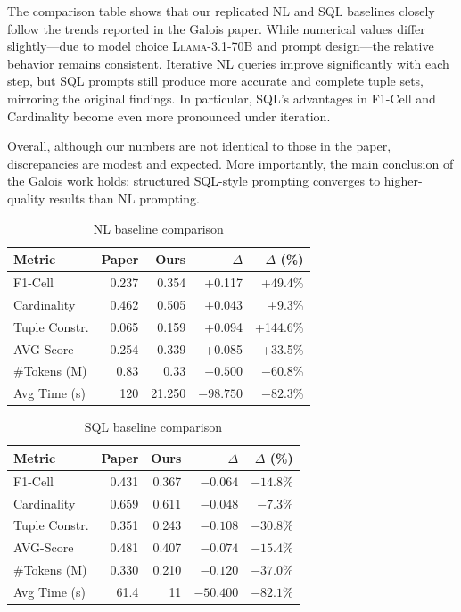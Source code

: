\documentclass[12pt]{article}
\begin{document}
The comparison table shows that our replicated NL and SQL baselines closely follow the trends reported in the Galois paper. While numerical values differ slightly---due to model choice \textsc{Llama-3.1-70B} and prompt design---the relative behavior remains consistent. Iterative NL queries improve significantly with each step, but SQL prompts still produce more accurate and complete tuple sets, mirroring the original findings. In particular, SQL’s advantages in F1-Cell and Cardinality become even more pronounced under iteration.

Overall, although our numbers are not identical to those in the paper, discrepancies are modest and expected. More importantly, the main conclusion of the Galois work holds: structured SQL-style prompting converges to higher-quality results than NL prompting.



\begin{table}[H]
  \centering
  \caption{NL baseline comparison}
  \label{tab:nl-comparison}
  \begin{tabular}{lrrrr}
    \hline
    \textbf{Metric} & \textbf{Paper} & \textbf{Ours} & $\Delta$ & $\Delta$ (\%) \\
    \hline
    F1-Cell       & 0.237   & 0.354   & +0.117   & +49.4\%  \\
    Cardinality   & 0.462   & 0.505   & +0.043   & +9.3\%   \\
    Tuple Constr. & 0.065   & 0.159   & +0.094   & +144.6\% \\
    AVG-Score     & 0.254   & 0.339   & +0.085   & +33.5\%  \\
    \#Tokens (M)  & 0.83   & 0.33   & $-0.500$ & $-60.8$\% \\
    Avg Time (s)  & 120 & 21.250  & $-98.750$& $-82.3$\% \\
    \hline
  \end{tabular}
\end{table}

\begin{table}[H]
  \centering
  \caption{SQL baseline comparison}
  \label{tab:sql-comparison}
  \begin{tabular}{lrrrr}
    \hline
    \textbf{Metric} & \textbf{Paper} & \textbf{Ours} & $\Delta$ & $\Delta$ (\%) \\
    \hline
    F1-Cell       & 0.431  & 0.367  & $-0.064$  & $-14.8$\% \\
    Cardinality   & 0.659  & 0.611  & $-0.048$  & $-7.3$\%  \\
    Tuple Constr. & 0.351  & 0.243  & $-0.108$  & $-30.8$\% \\
    AVG-Score     & 0.481  & 0.407  & $-0.074$  & $-15.4$\% \\
    \#Tokens (M)  & 0.330  & 0.210  & $-0.120$  & $-37.0$\% \\
    Avg Time (s)  & 61.4 & 11 & $-50.400$ & $-82.1$\% \\
    \hline
  \end{tabular}
\end{table}
\end{document}
